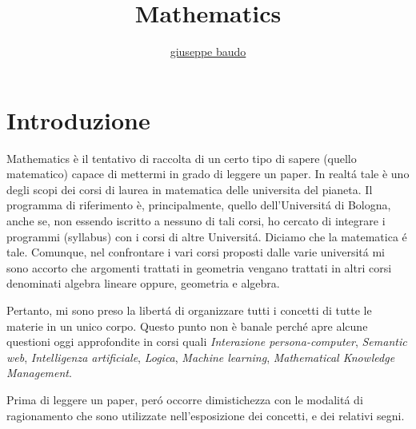 \documentclass[a4paper,10pt]{article}
\title{Mathematics}
\author{\href{http://www.baudo.hol.es}{giuseppe baudo}}
\begin{document}
\maketitle

\section{Introduzione}
Mathematics \`{e} il tentativo di raccolta di un certo tipo di sapere (quello matematico) capace di mettermi in grado di leggere un paper.
In realt\'{a} tale \`{e} uno degli scopi dei corsi di laurea in matematica delle universita del pianeta. Il programma di riferimento \`{e}, principalmente, quello dell'Universit\'{a}
di Bologna, anche se, non essendo iscritto a nessuno di tali corsi, ho cercato di integrare i programmi (syllabus) con i corsi di altre Universit\'{a}. Diciamo che la matematica \'{e} tale.
Comunque, nel confrontare i vari corsi proposti dalle varie universit\'{a} mi sono accorto che argomenti trattati in geometria vengano trattati in altri corsi denominati algebra lineare oppure, geometria e algebra.

Pertanto, mi sono preso la libert\'{a} di organizzare tutti i concetti di tutte le materie in un unico corpo. Questo punto non \`{e} banale perch\'{e} apre alcune questioni oggi
approfondite in corsi quali \textit{Interazione persona-computer}, \textit{Semantic web}, \textit{Intelligenza artificiale}, \textit{Logica}, \textit{Machine learning}, \textit{Mathematical Knowledge Management}.

Prima di leggere un paper, per\'{o} occorre dimistichezza con le modalit\'{a} di ragionamento che sono utilizzate nell'esposizione dei concetti, e dei relativi segni.
\end{document}
